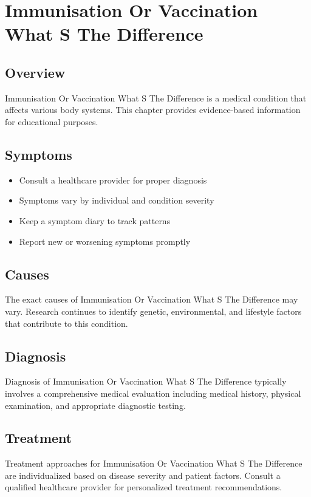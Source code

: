 \chapter{Immunisation Or Vaccination What S The Difference}

\section*{Overview}
Immunisation Or Vaccination What S The Difference is a medical condition that affects various body systems. This chapter provides evidence-based information for educational purposes.

\section*{Symptoms}
\begin{itemize}
  \item Consult a healthcare provider for proper diagnosis
  \item Symptoms vary by individual and condition severity
  \item Keep a symptom diary to track patterns
  \item Report new or worsening symptoms promptly
\end{itemize}

\section*{Causes}
The exact causes of Immunisation Or Vaccination What S The Difference may vary. Research continues to identify genetic, environmental, and lifestyle factors that contribute to this condition.

\section*{Diagnosis}
Diagnosis of Immunisation Or Vaccination What S The Difference typically involves a comprehensive medical evaluation including medical history, physical examination, and appropriate diagnostic testing.

\section*{Treatment}
Treatment approaches for Immunisation Or Vaccination What S The Difference are individualized based on disease severity and patient factors. Consult a qualified healthcare provider for personalized treatment recommendations.

